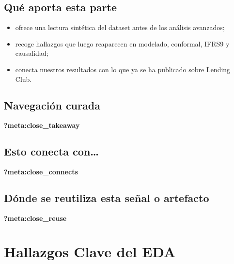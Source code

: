 \documentclass[
  spanish,
  11pt,
  letterpaper,
]{scrbook}
\providecommand{\tightlist}{%
  \setlength{\itemsep}{0pt}\setlength{\parskip}{0pt}}
\theoremstyle{plain}
\theoremstyle{remark}
\begin{document}
\section{Qué aporta esta parte}\label{quuxe9-aporta-esta-parte-1}

\begin{itemize}
\tightlist
\item
  ofrece una lectura sintética del dataset antes de los análisis
  avanzados;
\item
  recoge hallazgos que luego reaparecen en modelado, conformal, IFRS9 y
  causalidad;
\item
  conecta nuestros resultados con lo que ya se ha publicado sobre
  Lending Club.
\end{itemize}

\section{Navegación curada}\label{navegaciuxf3n-curada-3}

\begin{tcolorbox}[enhanced jigsaw, arc=.35mm, bottomrule=.15mm, bottomtitle=1mm, breakable, colback=white, colbacktitle=quarto-callout-tip-color!10!white, colframe=quarto-callout-tip-color-frame, coltitle=black, left=2mm, leftrule=.75mm, opacityback=0, opacitybacktitle=0.6, rightrule=.15mm, title=\textcolor{quarto-callout-tip-color}{\faLightbulb}\hspace{0.5em}{Qué debes quedarte}, titlerule=0mm, toprule=.15mm, toptitle=1mm]

\textbf{?meta:close\_takeaway}

\section{Esto conecta con\ldots{}}\label{esto-conecta-con-9}

\textbf{?meta:close\_connects}

\section{Dónde se reutiliza esta señal o
artefacto}\label{duxf3nde-se-reutiliza-esta-seuxf1al-o-artefacto-9}

\textbf{?meta:close\_reuse}

\end{tcolorbox}

\chapter{Hallazgos Clave del EDA}\label{sec-eda-highlights}
\end{document}
